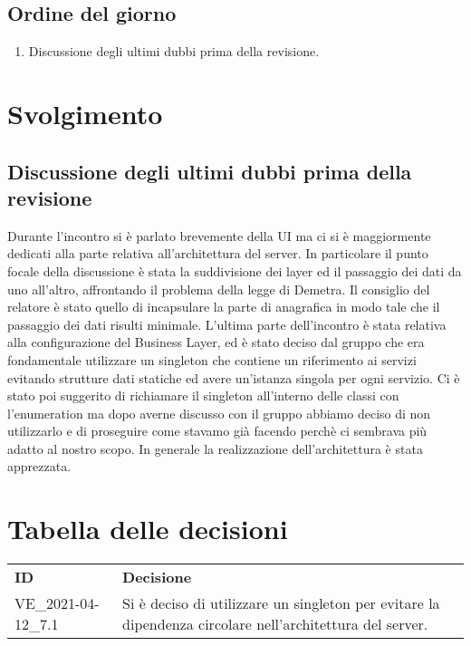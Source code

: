 \documentclass[]{article}
\begin{document}
	\subsection{Ordine del giorno}
	\begin{enumerate}
		\item Discussione degli ultimi dubbi prima della revisione.
	\end{enumerate}
	\newpage
	\section{Svolgimento}


	\subsection{Discussione degli ultimi dubbi prima della revisione}
	Durante l'incontro si è parlato brevemente della UI ma ci si è maggiormente dedicati alla parte relativa all'architettura del server. 
	In particolare il punto focale della discussione è stata la suddivisione dei layer ed il passaggio dei dati da uno all'altro, affrontando il problema della legge di Demetra.
	Il consiglio del relatore è stato quello di incapsulare la parte di anagrafica in modo tale che il passaggio dei dati risulti minimale.
	L'ultima parte dell'incontro è stata relativa alla configurazione del Business Layer, ed è stato deciso dal gruppo che era fondamentale utilizzare un singleton che contiene un riferimento ai servizi evitando strutture dati statiche ed avere un'istanza singola per ogni servizio.
	Ci è stato poi suggerito di richiamare il singleton all'interno delle classi con l'enumeration ma dopo averne discusso con il gruppo abbiamo deciso di non utilizzarlo e di proseguire come stavamo già facendo perchè ci sembrava più adatto al nostro scopo.
	In generale la realizzazione dell'architettura è stata apprezzata.

	\newpage

	\section{Tabella delle decisioni}

	\begin{table} [h!]
		\begin{center}
			\begin{tabular} { m{2cm} m{14cm} }
				\rowcolor{lightgray}
				\textbf{ID} & \textbf{Decisione}\\
				VE_2021-04-12_7.1 & Si è deciso di utilizzare un singleton per evitare la dipendenza circolare nell'architettura del server.
			\end{tabular}
		\end{center}
	\end{table}
\end{document}
